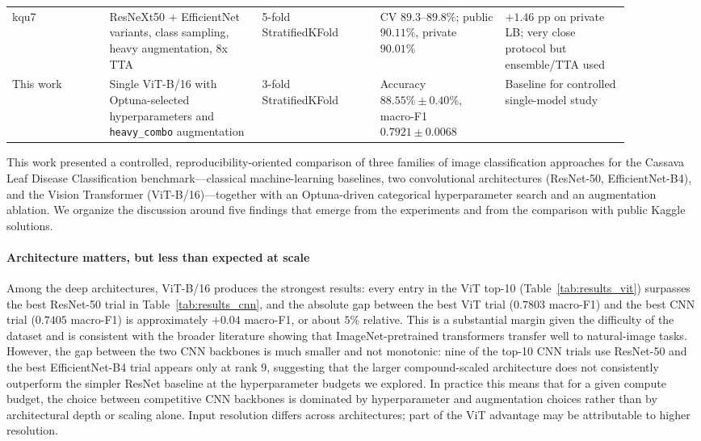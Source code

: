 \documentclass[conference]{IEEEtran}
\begin{document}
\begin{table}[t]
\begin{tabular}{p{0.14\linewidth} p{0.22\linewidth} p{0.17\linewidth} p{0.18\linewidth} p{0.18\linewidth}}
kqu7~\cite{kqu7cassava} & ResNeXt50 + EfficientNet variants, class sampling, heavy augmentation, 8x TTA & 5-fold StratifiedKFold & CV $89.3$--$89.8\%$; public $90.11\%$, private $90.01\%$ & $+1.46$ pp on private LB; very close protocol but ensemble/TTA used \\
This work & Single ViT-B/16 with Optuna-selected hyperparameters and \texttt{heavy\_combo} augmentation & 3-fold StratifiedKFold & Accuracy $88.55\% \pm 0.40\%$, macro-F1 $0.7921 \pm 0.0068$ & Baseline for controlled single-model study \\
\bottomrule
\end{tabular}
\end{table}

This work presented a controlled, reproducibility-oriented comparison of three families of image classification approaches for the Cassava Leaf Disease Classification benchmark---classical machine-learning baselines, two convolutional architectures (ResNet-50, EfficientNet-B4), and the Vision Transformer (ViT-B/16)---together with an Optuna-driven categorical hyperparameter search and an augmentation ablation. We organize the discussion around five findings that emerge from the experiments and from the comparison with public Kaggle solutions.

\paragraph{Architecture matters, but less than expected at scale}
Among the deep architectures, ViT-B/16 produces the strongest results: every entry in the ViT top-10 (Table~\ref{tab:results_vit}) surpasses the best ResNet-50 trial in Table~\ref{tab:results_cnn}, and the absolute gap between the best ViT trial ($0.7803$ macro-F1) and the best CNN trial ($0.7405$ macro-F1) is approximately $+0.04$ macro-F1, or about $5\%$ relative. This is a substantial margin given the difficulty of the dataset and is consistent with the broader literature showing that ImageNet-pretrained transformers transfer well to natural-image tasks. However, the gap between the two CNN backbones is much smaller and not monotonic: nine of the top-10 CNN trials use ResNet-50 and the best EfficientNet-B4 trial appears only at rank $9$, suggesting that the larger compound-scaled architecture does not consistently outperform the simpler ResNet baseline at the hyperparameter budgets we explored. In practice this means that for a given compute budget, the choice between competitive CNN backbones is dominated by hyperparameter and augmentation choices rather than by architectural depth or scaling alone. Input resolution differs across architectures; part of the ViT advantage may be attributable to higher resolution.
\end{document}
